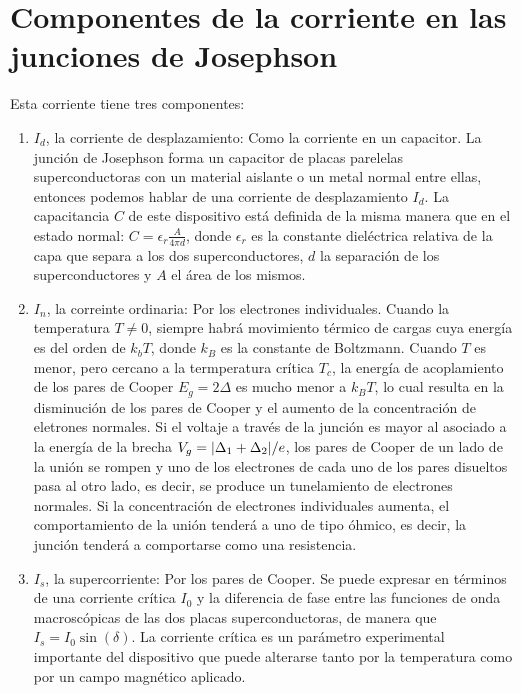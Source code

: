 \section{Componentes de la corriente en las junciones de Josephson}

Esta corriente tiene tres componentes:

\begin{enumerate}
    \item $I_d$, la corriente de desplazamiento: Como la corriente en un capacitor. La junción de Josephson forma un capacitor de placas parelelas superconductoras con un material aislante o un metal normal entre ellas, entonces podemos hablar de una corriente de desplazamiento $I_d$. La capacitancia $C$ de este dispositivo está definida de la misma manera que en el estado normal: $C = \epsilon_r \frac{A}{4 \pi d}$, donde $\epsilon_r$ es la constante dieléctrica relativa de la capa que separa a los dos superconductores, $d$ la separación de los superconductores y $A$ el área de los mismos.
    \item $I_n$, la correinte ordinaria: Por los electrones individuales. Cuando la temperatura $T \neq 0$, siempre habrá movimiento térmico de cargas cuya energía es del orden de $k_b T$, donde $k_B$ es la constante de Boltzmann. Cuando $T$ es menor, pero cercano a la termperatura crítica $T_c$, la energía de acoplamiento de los pares de Cooper $E_g = 2 \Delta$ es mucho menor a $k_B T$, lo cual resulta en la disminución de los pares de Cooper y el aumento de la concentración de eletrones normales. Si el voltaje a través de la junción es mayor al asociado a la energía de la brecha $V_g = \abs{\Delta_1 + \Delta_2}/e$, los pares de Cooper de un lado de la unión se rompen y uno de los electrones de cada uno de los pares disueltos pasa al otro lado, es decir, se produce un tunelamiento de electrones normales. Si la concentración de electrones individuales aumenta, el comportamiento de la unión tenderá a uno de tipo óhmico, es decir, la junción tenderá a comportarse como una resistencia.
    \item $I_s$, la supercorriente: Por los pares de Cooper. Se puede expresar en términos de una corriente crítica $I_0$ y la diferencia de fase entre las funciones de onda macroscópicas de las dos placas superconductoras, de manera que $I_s = I_0 \sin(\delta)$. La corriente crítica es un parámetro experimental importante del dispositivo que puede alterarse tanto por la temperatura como por un campo magnético aplicado.
\end{enumerate}


